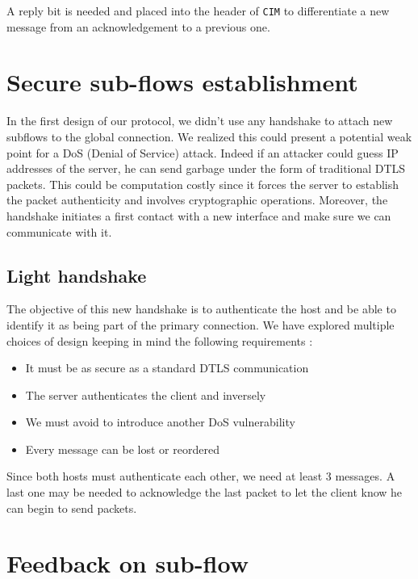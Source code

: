 \documentclass[11pt,a4paper,oldfontcommands]{memoir}
\begin{document}
A reply bit is needed and placed into the header of \verb!CIM! to differentiate a new message from an acknowledgement to a previous one.

\section{Secure sub-flows establishment}

In the first design of our protocol, we didn't use any handshake to attach new subflows to the global connection. We realized this could present a potential weak point for a DoS (Denial of Service) attack. Indeed if an attacker could guess IP addresses of the server, he can send garbage under the form of traditional DTLS packets. This could be computation costly since it forces the server to establish the packet authenticity and involves cryptographic operations. Moreover, the handshake initiates a first contact with a new interface and make sure we can communicate with it.

\subsection{Light handshake}


The objective of this new handshake is to authenticate the host and be able to identify it as being part of the primary connection. We have explored multiple choices of design keeping in mind the following requirements :

\begin{itemize}
\item It must be as secure as a standard DTLS communication
\item The server authenticates the client and inversely
\item We must avoid to introduce another DoS vulnerability
\item Every message can be lost or reordered
\end{itemize}

Since both hosts must authenticate each other, we need at least 3 messages. A last one may be needed to acknowledge the last packet to let the client know he can begin to send packets.




\section{Feedback on sub-flow}
\end{document}
